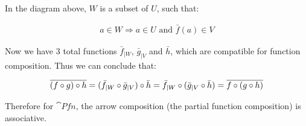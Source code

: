 \documentclass[11pt]{article}
\begin{document}
In the diagram above, $W$ is a subset of $U$, such that:

\begin{align*}
a \in W \Rightarrow a \in U \text{ and } \bar{f}(a) \in V
\end{align*}

Now we have 3 total functions $\bar{f}_{|W}$, $\bar{g}_{|V}$ and $\bar{h}$,
which are compatible for function composition. Thus we can conclude that:

\begin{align*}
\overline{(f \circ g) \circ h} =
(\bar{f}_{|W} \circ \bar{g}_{|V}) \circ \bar{h} =
\bar{f}_{|W} \circ (\bar{g}_{|V} \circ \bar{h}) =
\overline{f \circ (g \circ h)}
\end{align*}

Therefore for $\cat{Pfn}$, the arrow composition (the partial function composition)
is associative.
\end{document}
